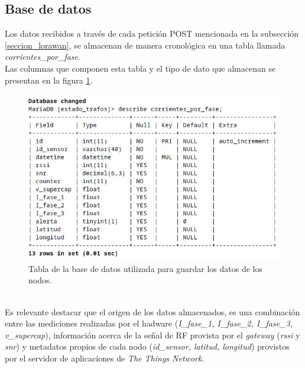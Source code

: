 \subsection{Base de datos}
Los datos recibidos a trav\'{e}s de cada petición POST mencionada en la subsecci\'{o}n \ref{seccion_lorawan}, se almacenan de manera cronológica en una tabla llamada \textit{corrientes\_por\_fase}.\\
Las columnas que componen esta tabla y el tipo de dato que almacenan se presentan en la figura \ref{fig:tablacorrientesporfase}.\\
\begin{figure}[h]
	\centering
	\includegraphics[width=1.0\linewidth]{Figures/tabla_corrientes_por_fase}
	\caption{Tabla de la base de datos utilizada para guardar los datos de los nodos.}
	\label{fig:tablacorrientesporfase}
\end{figure}\\
Es relevante destacar que el origen de los datos almacenados, es una combinación entre las mediciones realizadas por el hadware (\textit{I\_fase\_1, I\_fase\_2, I\_fase\_3, v\_supercap}), información acerca de la señal de RF provista por el \textit{gateway} (\textit{rssi} y \textit{snr}) y metadatos propios de cada nodo (\textit{id\_sensor, latitud, longitud}) provistos por el servidor de aplicaciones de \textit{The Things Network}.\\


